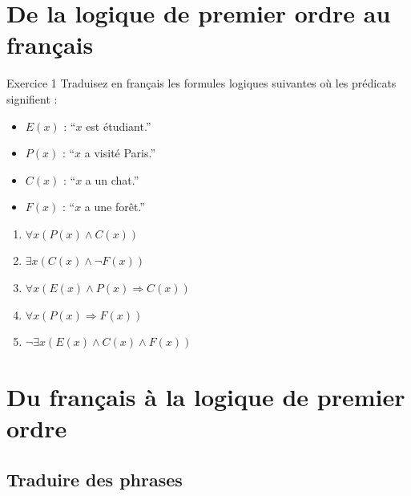 \documentclass[a4paper,11pt]{article}
\begin{document}
\section{De la logique de premier ordre au français}

\begin{exercisebox}{Exercice 1}
Traduisez en français les formules logiques suivantes où les prédicats signifient :
\begin{itemize}
    \item $E(x)$ : ``$x$ est étudiant.''
    \item $P(x)$ : ``$x$ a visité Paris.''
    \item $C(x)$ : ``$x$ a un chat.''
    \item $F(x)$ : ``$x$ a une forêt.''
\end{itemize}

\begin{enumerate}
    \item $\forall x(P(x) \wedge C(x))$
    \item $\exists x(C(x) \wedge \neg F(x))$
    \item $\forall x(E(x) \wedge P(x) \Rightarrow C(x))$
    \item $\forall x(P(x) \Rightarrow F(x))$
    \item $\neg\exists x(E(x) \wedge C(x) \wedge F(x))$
\end{enumerate}
\end{exercisebox}

\section{Du français à la logique de premier ordre}

\subsection{Traduire des phrases}
\end{document}
